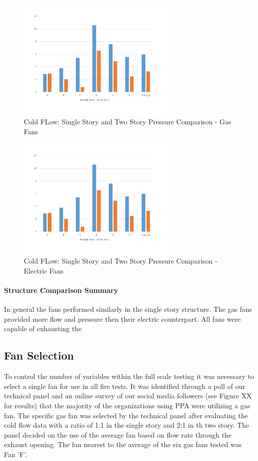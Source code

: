 \documentclass{article}
\begin{document}
\begin{figure}[H]
	\centering
	\includegraphics[width=3in]{0_Images/ColdFlow/Gas_Press.pdf}
	\caption{Cold FLow: Single Story and Two Story Pressure Comparison - Gas Fans}
	\label{fig:SingleTwoCompGasPress}
\end{figure}

\begin{figure}[H]
	\centering
	\includegraphics[width=3in]{0_Images/ColdFlow/Gas_Press.pdf}
	\caption{Cold FLow: Single Story and Two Story Pressure Comparison - Electric Fans}
	\label{fig:SingleTwoCompElePress}
\end{figure}

\paragraph{Structure Comparison Summary} \mbox{}

In general the fans performed similarly in the single story structure. The gas fans provided more flow and pressure then their electric counterpart. All fans were capable of exhausting the 

\subsection{Fan Selection}

To control the number of variables within the full scale testing it was necessary to select a single fan for use in all fire tests. It was identified through a poll of our technical panel and an online survey of our social media followers (see Figure XX for results) that the majority of the organizations using PPA were utilizing a gas fan. The specific gas fan was selected by the technical panel after evaluating the cold flow data with a ratio of 1:1 in the single story and 2:1 in th two story. The panel decided on the use of the average fan based on flow rate through the exhaust opening. The fan nearest to the average of the six gas fans tested was Fan 'F'. 
\end{document}
